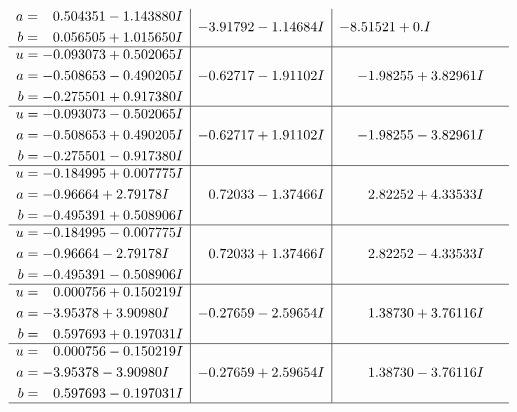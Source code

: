\documentclass[1p]{elsarticle_modified}
\theoremstyle{definition}
\begin{document}
$$\begin{array}{c|c|c}
\begin{aligned}
a &= \phantom{-}0.504351 - 1.143880 I \\
b &= \phantom{-}0.056505 + 1.015650 I\end{aligned}
 & -3.91792 - 1.14684 I & -8.51521 + 0. I\phantom{ +0.000000I} \\ \hline\begin{aligned}
u &= -0.093073 + 0.502065 I \\
a &= -0.508653 - 0.490205 I \\
b &= -0.275501 + 0.917380 I\end{aligned}
 & -0.62717 - 1.91102 I & -1.98255 + 3.82961 I \\ \hline\begin{aligned}
u &= -0.093073 - 0.502065 I \\
a &= -0.508653 + 0.490205 I \\
b &= -0.275501 - 0.917380 I\end{aligned}
 & -0.62717 + 1.91102 I & -1.98255 - 3.82961 I \\ \hline\begin{aligned}
u &= -0.184995 + 0.007775 I \\
a &= -0.96664 + 2.79178 I \\
b &= -0.495391 + 0.508906 I\end{aligned}
 & \phantom{-}0.72033 - 1.37466 I & \phantom{-}2.82252 + 4.33533 I \\ \hline\begin{aligned}
u &= -0.184995 - 0.007775 I \\
a &= -0.96664 - 2.79178 I \\
b &= -0.495391 - 0.508906 I\end{aligned}
 & \phantom{-}0.72033 + 1.37466 I & \phantom{-}2.82252 - 4.33533 I \\ \hline\begin{aligned}
u &= \phantom{-}0.000756 + 0.150219 I \\
a &= -3.95378 + 3.90980 I \\
b &= \phantom{-}0.597693 + 0.197031 I\end{aligned}
 & -0.27659 - 2.59654 I & \phantom{-}1.38730 + 3.76116 I \\ \hline\begin{aligned}
u &= \phantom{-}0.000756 - 0.150219 I \\
a &= -3.95378 - 3.90980 I \\
b &= \phantom{-}0.597693 - 0.197031 I\end{aligned}
 & -0.27659 + 2.59654 I & \phantom{-}1.38730 - 3.76116 I\\
 \hline 
 \end{array}$$\newpage\newpage\renewcommand{\arraystretch}{1}
\end{document}
